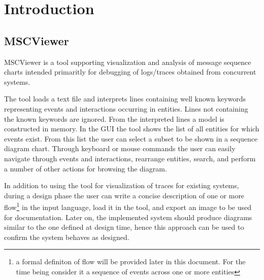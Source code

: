 \documentclass[11pt, twoside, titlepage]{book}
\date{\today}
\newcommand{\prog}{MSCViewer}
\begin{document}
\clearpage
\thispagestyle{empty}

 

\cleardoublepage

\setcounter{page}{1}


\chapter{Introduction}

\section{\prog}
\prog{} is a tool supporting visualization and analysis of message sequence
charts intended primaritly for debugging of logs/traces obtained from concurrent systems.

The tool loads a text file and interprets lines containing well known keywords representing
events and interactions occurring in entities. Lines not containing the known keywords are
ignored. From the interpreted lines a model is constructed in memory. In the GUI the tool 
shows the list of all entities for which events exist. From this list the user can 
select a subset to be shown in a sequence diagram chart. Through keyboard or mouse commands
the user can easily navigate through events and interactions, rearrange entities, search, 
and perform a number of other actions for browsing the diagram.

In addition to using the tool for visualization of traces for existing 
systems, during a design phase the user can write a concise description of one or
more flow\footnote{a formal definiton of flow will be provided later in this document.
For the time being consider it a sequence of events across one or more entities} 
in the input language, load it in the tool, and export an image to 
be used for documentation. Later on, the implemented system should produce diagrams
similar to the one defined at design time, hence this approach can be used to confirm
the system behaves as designed.
\end{document}
